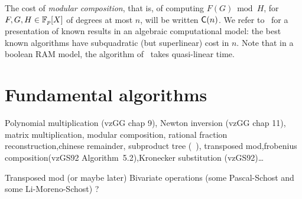 The cost of {\em modular composition}, that is, of computing $F(G)
\bmod H$, for $F,G,H\in\mathbb{F}_p[X]$ of degrees at most $n$, will be
written $\mathsf{C}(n)$. We refer to~\cite[Ch.~12]{vzGG} for a
presentation of known results in an algebraic computational model: the
best known algorithms have subquadratic (but superlinear) cost in
$n$. Note that in a boolean RAM model, the algorithm of~\cite{KeUm08}
takes quasi-linear time.

\section{Fundamental algorithms}
\label{sec:fund-algor}
Polynomial multiplication (vzGG chap 9), Newton inversion (vzGG chap
11), matrix multiplication, modular composition, rational fraction
reconstruction,chinese remainder, subproduct tree
(~\cite[Algorithm~10.3]{vzGG}), transposed mod,frobenius
composition(vzGS92 Algorithm~5.2),Kronecker substitution (vzGS92)\ldots

Transposed mod (or maybe later)
Bivariate operations (some Pascal-Schost and some Li-Moreno-Schost) ?



